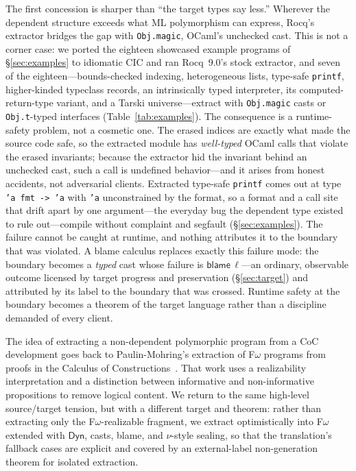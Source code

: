 \documentclass[acmsmall,anonymous=false,nonacm]{acmart}
\newcommand{\dyn}{\ensuremath{\mathsf{Dyn}}}
\newcommand{\blame}[1]{\mathsf{blame}\,#1}
\begin{document}
The first concession is sharper than ``the target types say less.''  Wherever
the dependent structure exceeds what ML polymorphism can express, Rocq's
extractor bridges the gap with \texttt{Obj.magic}, OCaml's unchecked cast.
This is not a corner case: we ported the eighteen showcased example programs
of \S\ref{sec:examples} to idiomatic CIC and ran Rocq~9.0's stock extractor,
and seven of the eighteen---bounds-checked indexing, heterogeneous lists,
type-safe \texttt{printf}, higher-kinded typeclass records, an intrinsically
typed interpreter, its computed-return-type variant, and a Tarski
universe---extract with \texttt{Obj.magic} casts or \texttt{Obj.t}-typed
interfaces (Table~\ref{tab:examples}).  The consequence is a runtime-safety
problem, not a cosmetic one.  The erased indices are exactly what made the
source code safe, so the extracted module has \emph{well-typed} OCaml calls
that violate the erased invariants; because the extractor hid the invariant
behind an unchecked cast, such a call is undefined behavior---and it arises
from honest accidents, not adversarial clients.  Extracted type-safe
\texttt{printf} comes out at type \texttt{'a fmt -> 'a} with \texttt{'a}
unconstrained by the format, so a format and a call site that drift apart by
one argument---the everyday bug the dependent type existed to rule
out---compile without complaint and segfault (\S\ref{sec:examples}).  The
failure cannot be caught at runtime, and nothing attributes it to the
boundary that was violated.  A blame calculus replaces exactly this failure
mode: the boundary becomes a \emph{typed} cast whose failure is
$\blame{\ell}$---an ordinary, observable outcome licensed by target progress
and preservation (\S\ref{sec:target}) and attributed by its label to the
boundary that was crossed.  Runtime safety at the boundary becomes a theorem
of the target language rather than a discipline demanded of every client.

The idea of extracting a non-dependent polymorphic program from a CoC
development goes back to Paulin-Mohring's extraction of F$\omega$ programs from
proofs in the Calculus of Constructions~\cite{paulinmohring1989fomega}.  That
work uses a realizability interpretation and a distinction between informative
and non-informative propositions to remove logical content.  We return to the
same high-level source/target tension, but with a different target and theorem:
rather than extracting only the F$\omega$-realizable fragment, we extract
optimistically into F$\omega$ extended with $\dyn$, casts, blame, and
$\nu$-style sealing, so that the translation's fallback cases are explicit and
covered by an external-label non-generation theorem for isolated extraction.
\end{document}
